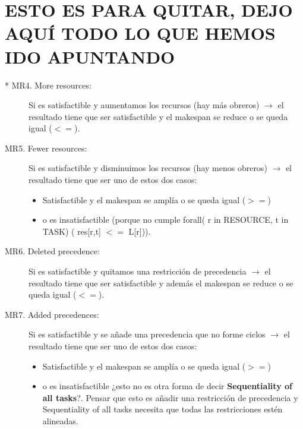 
\section{ESTO ES PARA QUITAR, DEJO AQUÍ TODO LO QUE HEMOS IDO APUNTANDO}



\begin{description}


\item[* MR4. More resources:] Si es satisfactible y aumentamos los recursos  (hay más obreros) $\rightarrow$  el resultado tiene que ser satisfactible y el makespan se reduce o se queda igual ($<=$).

\item[MR5. Fewer resources:] Si es satisfactible y disminuimos los recursos  (hay menos obreros)  $\rightarrow$  el resultado tiene que ser uno de estos dos casos: 

\begin{itemize}
    \item Satisfactible y el makespan se amplía o se queda igual ($>=$)
    \item o es insatisfactible  (porque no cumple  forall( r in RESOURCE, t in TASK) ( res[r,t]  $<=$ L[r])).
\end{itemize}





\item[MR6. Deleted precedence:]  Si es satisfactible y quitamos una restricción de precedencia $\rightarrow$ el resultado tiene que ser satisfactible y además el makespan se reduce o se queda igual ($<=$).




\item [MR7. Added precedences:] Si es satisfactible y se añade una precedencia que no forme ciclos $\rightarrow$ el resultado tiene que ser uno de estos dos casos: 

\begin{itemize}
    \item Satisfactible y el makespan se amplía o se queda igual ($>=$)
    \item o es insatisfactible  ¿esto no es otra forma de decir \textbf{Sequentiality of all tasks}?. Pensar que esto es añadir una restricción de precedencia y Sequentiality of all tasks necesita que todas las restricciones estén alineadas.
\end{itemize}




\end{description}
